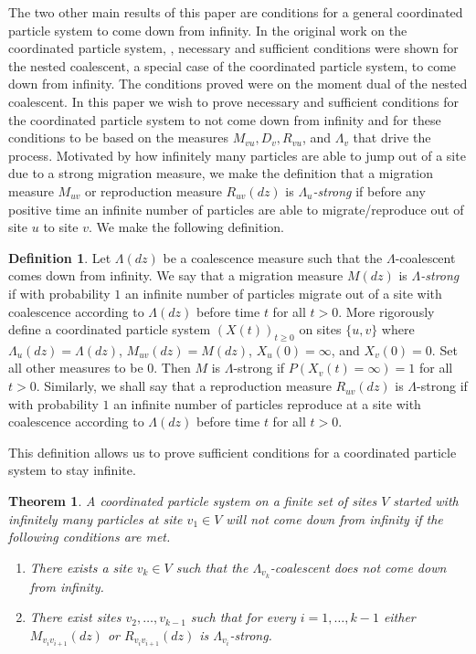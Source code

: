 \documentclass[11pt]{article}
\newtheorem{theorem}{Theorem}
\theoremstyle{definition}
\newtheorem{defi}{Definition}
\begin{document}
\noindent The two other main results of this paper are conditions for a general coordinated particle system to come down from infinity. In the original work on the coordinated particle system, \cite{CPS2021}, necessary and sufficient conditions were shown for the nested coalescent, a special case of the coordinated particle system, to come down from infinity. The conditions proved were on the moment dual of the nested coalescent. In this paper we wish to prove necessary and sufficient conditions for the coordinated particle system to not come down from infinity and for these conditions to be based on the measures $M_{vu}, D_{v}, R_{vu}$, and $\Lambda_{v}$ that drive the process. Motivated by how infinitely many particles are able to jump out of a site due to a strong migration measure, we make the definition that a migration measure $M_{uv}$ or reproduction measure $R_{uv}(dz)$ is \emph{$\Lambda_u$-strong} if before any positive time an infinite number of particles are able to migrate/reproduce out of site $u$ to site $v$. We make the following definition.

\begin{defi}\label{D:lambdastrong}
    Let $\Lambda(dz)$ be a coalescence measure such that the $\Lambda$-coalescent comes down from infinity. We say that a migration measure $M(dz)$ is \emph{$\Lambda$-strong} if with probability $1$ an infinite number of particles migrate out of a site with coalescence according to $\Lambda(dz)$ before time $t$ for all $t > 0$. More rigorously define a coordinated particle system $(X(t))_{t \geq 0}$ on sites $\{u,v\}$ where $\Lambda_u(dz) = \Lambda(dz)$, $M_{uv}(dz) = M(dz)$, $X_u(0) = \infty$, and $X_v(0) = 0$. Set all other measures to be $0$. Then $M$ is $\Lambda$-strong if $P(X_v(t) = \infty) = 1$ for all $t > 0$. Similarly, we shall say that a reproduction measure $R_{uv}(dz)$ is $\Lambda$-strong if with probability $1$ an infinite number of particles reproduce at a site with coalescence according to $\Lambda(dz)$ before time $t$ for all $t > 0$.
\end{defi}

\noindent This definition allows us to prove sufficient conditions for a coordinated particle system to stay infinite.
%
\begin{theorem}\label{T:comingdown}
    A coordinated particle system on a finite set of sites $V$ started with infinitely many particles at site $v_1 \in V$ will not come down from infinity if the following conditions are met.

    \begin{enumerate}
        \item[(a)] There exists a site $v_k \in V$ such that the $\Lambda_{v_k}$-coalescent does not come down from infinity.

        \item[(b)] There exist sites $v_2, \ldots, v_{k-1}$ such that for every $i = 1, \ldots, k-1$ either $M_{v_iv_{i+1}}(dz)$ or $R_{v_iv_{i+1}}(dz)$ is $\Lambda_{v_i}$-strong.
    \end{enumerate}
\end{theorem}
\end{document}
